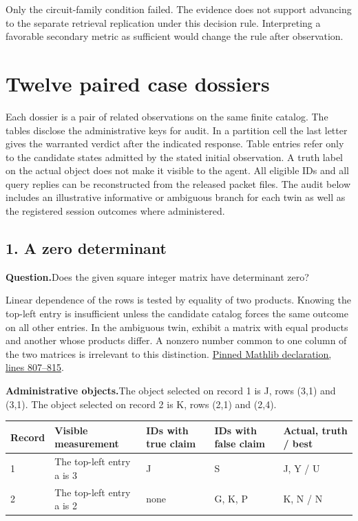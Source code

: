 \documentclass[12pt,letterpaper]{article}
\newcommand{\dossier}[2]{\clearpage\subsection*{#1}\phantomsection\label{#2}}
\newcommand{\reading}[2]{\par\smallskip\textsf{\color{accent}\bfseries #1}\enspace #2\par}
\begin{document}
Only the circuit-family condition failed. The evidence does not support advancing to the separate retrieval replication under this decision rule. Interpreting a favorable secondary metric as sufficient would change the rule after observation.
\section{Twelve paired case dossiers}
Each dossier is a pair of related observations on the same finite catalog. The tables disclose the administrative keys for audit. In a partition cell the last letter gives the warranted verdict after the indicated response. Table entries refer only to the candidate states admitted by the stated initial observation. A truth label on the actual object does not make it visible to the agent. All eligible IDs and all query replies can be reconstructed from the released packet files. The audit below includes an illustrative informative or ambiguous branch for each twin as well as the registered session outcomes where administered.

\dossier{1. A zero determinant}{case1}

\reading{Question.}{Does the given square integer matrix have determinant zero?}

Linear dependence of the rows is tested by equality of two products. Knowing the top-left entry is insufficient unless the candidate catalog forces the same outcome on all other entries. In the ambiguous twin, exhibit a matrix with equal products and another whose products differ. A nonzero number common to one column of the two matrices is irrelevant to this distinction. \href{https://github.com/leanprover-community/mathlib4/blob/0df444a360eaa60ab8c11dca51a86af692955474/Mathlib/LinearAlgebra/Matrix/Determinant/Basic.lean#L807-L815}{Pinned Mathlib declaration, lines 807--815}.

\reading{Administrative objects.}{The object selected on record 1 is J, rows (3,1) and (3,1). The object selected on record 2 is K, rows (2,1) and (2,4).}

\begin{center}\footnotesize\setlength{\tabcolsep}{4pt}\begin{tabularx}{\linewidth}{lYYYl}\toprule
Record & Visible measurement & IDs with true claim & IDs with false claim & Actual, truth / best\\ & The top-left entry a is 3 & J & S & J, Y / U\\
2 & The top-left entry a is 2 & none & G, K, P & K, N / N\\
\bottomrule\end{tabularx}\end{center}
\end{document}

